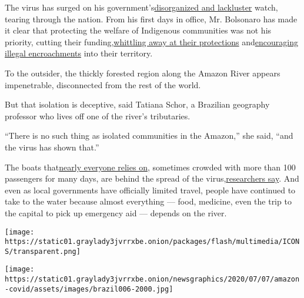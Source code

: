 The virus has surged on his
government's\href{https://www.nytimes3xbfgragh.onion/2020/06/10/world/americas/bolsonaro-coup-coronavirus-brazil.html}{}\href{https://www.nytimes3xbfgragh.onion/2020/06/10/world/americas/bolsonaro-coup-coronavirus-brazil.html}{disorganized
and lackluster} watch, tearing through the nation. From his first days
in office, Mr. Bolsonaro has made it clear that protecting the welfare
of Indigenous communities was not his priority, cutting their
funding,\href{https://www.nytimes3xbfgragh.onion/2020/04/19/world/americas/bolsonaro-brazil-amazon-indigenous.html}{}\href{https://www.nytimes3xbfgragh.onion/2020/04/19/world/americas/bolsonaro-brazil-amazon-indigenous.html}{whittling
away at their protections}
and\href{https://www.nytimes3xbfgragh.onion/2018/11/10/world/americas/brazil-indigenous-mining-bolsonaro.html}{}\href{https://www.nytimes3xbfgragh.onion/2018/11/10/world/americas/brazil-indigenous-mining-bolsonaro.html}{encouraging
illegal encroachments} into their territory.

To the outsider, the thickly forested region along the Amazon River
appears impenetrable, disconnected from the rest of the world.

But that isolation is deceptive, said Tatiana Schor, a Brazilian
geography professor who lives off one of the river's tributaries.

``There is no such thing as isolated communities in the Amazon,'' she
said, ``and the virus has shown that.''

The boats
that\href{https://www.nytimes3xbfgragh.onion/2016/11/19/world/americas/brazil-amazon-pirates-riverboats-rain-forest.html}{}\href{https://www.nytimes3xbfgragh.onion/2016/11/19/world/americas/brazil-amazon-pirates-riverboats-rain-forest.html}{nearly
everyone relies on}, sometimes crowded with more than 100 passengers for
many days, are behind the spread of the
virus,\href{https://journals.openedition.org/confins/30072}{}\href{https://journals.openedition.org/confins/30072}{researchers
say}. And even as local governments have officially limited travel,
people have continued to take to the water because almost everything ---
food, medicine, even the trip to the capital to pick up emergency aid
--- depends on the river.

\texttt{[image: https://static01.graylady3jvrrxbe.onion/packages/flash/multimedia/ICONS/transparent.png]}

\texttt{[image: https://static01.graylady3jvrrxbe.onion/newsgraphics/2020/07/07/amazon-covid/assets/images/brazil006-2000.jpg]}

